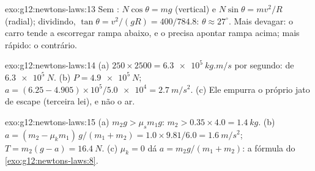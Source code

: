 \begin{solution}{exo:g12:newtons-laws:13}
Sem : $N\cos\theta = mg$ (vertical) e $N\sin\theta =
mv^2/R$ (radial); dividindo, $\tan\theta = v^2/(gR) = 400/784.8$:
$\theta \approx 27^\circ$. Mais devagar: o carro tende a escorregar
rampa abaixo, e o  precisa apontar rampa acima; mais rápido: o
contrário.
\end{solution}

\begin{solution}{exo:g12:newtons-laws:14}
(a) $250 \times 2500 = \qty{6.3e5}{kg.m/s}$ por segundo:  de
$\qty{6.3e5}{N}$. (b) $P = \qty{4.9e5}{N}$;
$a = (6.25 - 4.905) \times 10^5 / \num{5.0e4} = \qty{2.7}{m/s^2}$.
(c) Ele empurra o próprio jato de escape (terceira lei), e não o ar.
\end{solution}

\begin{solution}{exo:g12:newtons-laws:15}
(a) $m_2 g > \mu_s m_1 g$: $m_2 > 0.35 \times 4.0 = \qty{1.4}{kg}$.
(b) $a = (m_2 - \mu_k m_1)\,g/(m_1 + m_2) = 1.0 \times 9.81/6.0 =
\qty{1.6}{m/s^2}$; $T = m_2(g - a) = \qty{16.4}{N}$.
(c) $\mu_k = 0$ dá $a = m_2 g/(m_1 + m_2)$: a fórmula do
\cref{exo:g12:newtons-laws:8}.
\end{solution}

